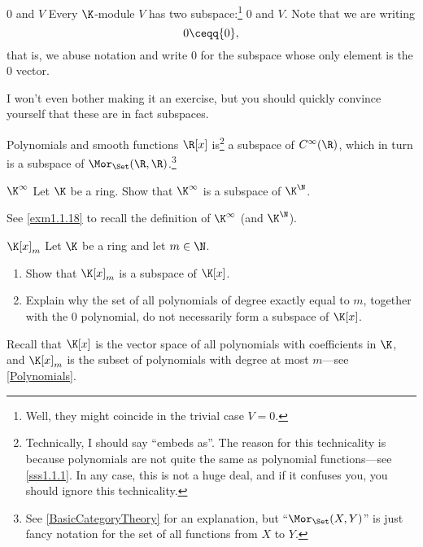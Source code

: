 \begin{exm}{$0$ and $V$}{}
	Every $\K$-module $V$ has two subspace:\footnote{Well, they might coincide in the trivial case $V=0$.}  $0$ and $V$.  Note that we are writing
	\begin{equation}
		0\ceqq \{ 0\} ,
	\end{equation}
	that is, we abuse notation and write $0$ for the subspace whose only element is the $0$ vector.
	
	I won't even bother making it an exercise, but you should quickly convince yourself that these are in fact subspaces.
\end{exm}
\begin{exm}{Polynomials and smooth functions}{}
	$\R [x]$ is\footnote{Technically, I should say ``embeds as''.  The reason for this technicality is because polynomials are not quite the same as polynomial functions---see \cref{sss1.1.1}.  In any case, this is not a huge deal, and if it confuses you, you should ignore this technicality.} a subspace of $C^{\infty}(\R )$, which in turn is a subspace of $\Mor _{\Set}(\R ,\R )$.\footnote{See \cref{BasicCategoryTheory} for an explanation, but ``$\Mor _{\Set}(X,Y)$'' is just fancy notation for the set of all functions from $X$ to $Y$.}
\end{exm}
\begin{exr}{$\K ^{\infty}$}{}
	Let $\K$ be a ring.  Show that $\K ^{\infty}$ is a subspace of $\K ^{\N}$.
	\begin{rmk}
		See \cref{exm1.1.18} to recall the definition of $\K ^{\infty}$ (and $\K ^{\N}$).
	\end{rmk}
\end{exr}
\begin{exr}{$\K [x]_m$}{}
	Let $\K$ be a ring and let $m\in \N$.
	\begin{enumerate}
		\item Show that $\K [x]_m$ is a subspace of $\K [x]$.
		\item Explain why the set of all polynomials of degree exactly equal to $m$, together with the $0$ polynomial, do not necessarily form a subspace of $\K [x]$.
	\end{enumerate}
	\begin{rmk}
		Recall that $\K [x]$ is the vector space of all polynomials with coefficients in $\K$, and $\K [x]_m$ is the subset of polynomials with degree at most $m$---see \cref{Polynomials}.
	\end{rmk}
\end{exr}

